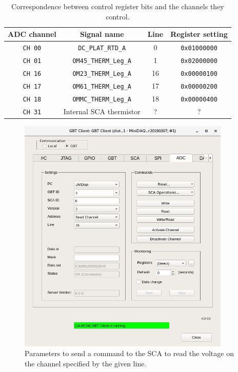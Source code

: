 \begin{table}[ht]
    \begin{tabular}{cccc}
        \toprule
        ADC channel & Signal name & Line & Register setting \\
        \midrule
        \texttt{CH 00} & \texttt{DC\_PLAT\_RTD\_A}    & 0  & \texttt{0x01000000} \\
        \texttt{CH 01} & \texttt{OM45\_THERM\_Leg\_A} & 1  & \texttt{0x02000000} \\
        \texttt{CH 16} & \texttt{OM23\_THERM\_Leg\_A} & 16 & \texttt{0x00000100} \\
        \texttt{CH 17} & \texttt{OM61\_THERM\_Leg\_A} & 17 & \texttt{0x00000200} \\
        \texttt{CH 18} & \texttt{OMMC\_THERM\_Leg\_A} & 18 & \texttt{0x00000400} \\
        \texttt{CH 31} & Internal SCA thermistor      & ?  & ? \\
        \bottomrule
    \end{tabular}
    \caption{
        Correspondence between control register bits and the channels they
        control.
    }
    \label{tab:register-channel-correspondence}
\end{table}

\begin{figure}[ht]
    \centering
    \includegraphics[width=0.9\textwidth]{res/gbt_client_adc_readout_readchannel.png}
    \caption{
        Parameters to send a command to the SCA to read the voltage on the
        channel specified by the given line.
    }
    \label{fig:adc-readout}
\end{figure}

